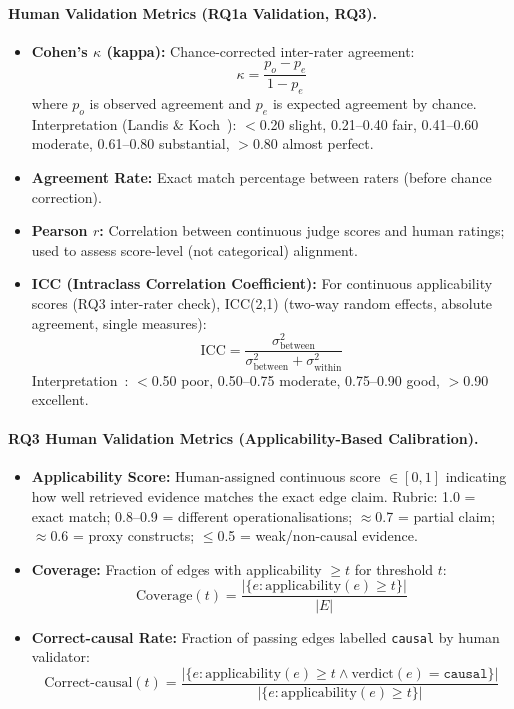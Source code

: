 \paragraph{Human Validation Metrics (RQ1a Validation, RQ3).}
\begin{itemize}[noitemsep]
    \item \textbf{Cohen's $\kappa$ (kappa):} Chance-corrected inter-rater agreement:
    \begin{equation}
        \kappa = \frac{p_o - p_e}{1 - p_e}
    \end{equation}
    where $p_o$ is observed agreement and $p_e$ is expected agreement by chance. Interpretation (Landis \& Koch~\cite{landis1977measurement}): $<$0.20 slight, 0.21--0.40 fair, 0.41--0.60 moderate, 0.61--0.80 substantial, $>$0.80 almost perfect.
    \item \textbf{Agreement Rate:} Exact match percentage between raters (before chance correction).
    \item \textbf{Pearson $r$:} Correlation between continuous judge scores and human ratings; used to assess score-level (not categorical) alignment.
    \item \textbf{ICC (Intraclass Correlation Coefficient):} For continuous applicability scores (RQ3 inter-rater check), ICC(2,1) (two-way random effects, absolute agreement, single measures):
    \begin{equation}
        \text{ICC} = \frac{\sigma^2_{\text{between}}}{\sigma^2_{\text{between}} + \sigma^2_{\text{within}}}
    \end{equation}
    Interpretation~\cite{koo2016guideline}: $<$0.50 poor, 0.50--0.75 moderate, 0.75--0.90 good, $>$0.90 excellent.
\end{itemize}

\paragraph{RQ3 Human Validation Metrics (Applicability-Based Calibration).}
\begin{itemize}[noitemsep]
    \item \textbf{Applicability Score:} Human-assigned continuous score $\in[0,1]$ indicating how well retrieved evidence matches the exact edge claim. Rubric: 1.0 = exact match; 0.8--0.9 = different operationalisations; $\approx$0.7 = partial claim; $\approx$0.6 = proxy constructs; $\leq$0.5 = weak/non-causal evidence.
    \item \textbf{Coverage:} Fraction of edges with applicability $\geq t$ for threshold $t$:
    \begin{equation}
        \text{Coverage}(t) = \frac{|\{e : \text{applicability}(e) \geq t\}|}{|E|}
    \end{equation}
    \item \textbf{Correct-causal Rate:} Fraction of passing edges labelled \texttt{causal} by human validator:
    \begin{equation}
        \text{Correct-causal}(t) = \frac{|\{e : \text{applicability}(e) \geq t \land \text{verdict}(e) = \texttt{causal}\}|}{|\{e : \text{applicability}(e) \geq t\}|}
    \end{equation}
\end{itemize}

